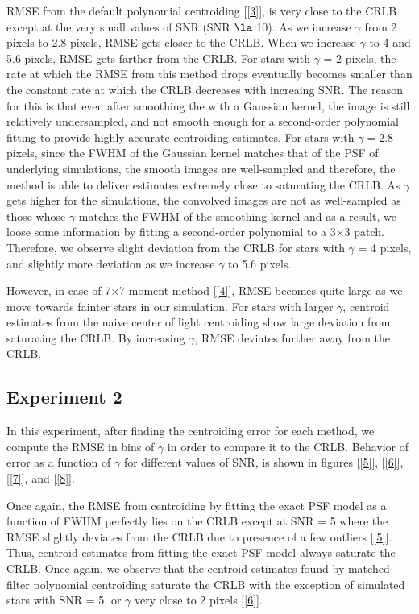 \documentclass[12pt, preprint]{aastex}
\begin{document}
RMSE from the default polynomial centroiding [\ref{3}],
is very close to the CRLB except at the very small values of SNR (SNR $\la$ 10).
As we increase $\gamma$ from 2 pixels to 2.8 pixels, RMSE gets closer
to the CRLB. When we increase $\gamma$ to
4 and 5.6 pixels, RMSE gets farther from the CRLB. For stars with $\gamma$ = 2 pixels, 
the rate at which the RMSE from this method drops
eventually becomes smaller than the constant rate at which the CRLB
decreases with increaing SNR. The reason for this is that even after smoothing
the with a Gaussian kernel, the image is still relatively undersampled, and not smooth enough
for a second-order polynomial fitting to provide highly accurate centroiding estimates.
For stars with $\gamma=2.8$ pixels, since the FWHM of the Gaussian kernel matches that 
of the PSF of underlying simulations, the smooth images are well-sampled and therefore, 
the method is able to deliver estimates extremely close to saturating the CRLB. As $\gamma$
gets higher for the simulations, the convolved images are not as well-sampled as those 
whose $\gamma$ matches the FWHM of the smoothing kernel and as a result, we loose
some information by fitting a second-order polynomial to a 3$\times$3 patch. Therefore,
 we observe slight deviation from the CRLB for stars with $\gamma$ = 4 pixels, and 
slightly more deviation as we increase $\gamma$ to 5.6 pixels.

However, in case of 7$\times$7 moment method [\ref{4}], RMSE becomes
quite large as we move towards fainter stars in our simulation.
For stars with larger $\gamma$, centroid estimates from the naive center of light 
centroiding show large deviation from saturating the CRLB. By increasing $\gamma$,
RMSE deviates further away from the CRLB.

\subsection{Experiment 2}

In this experiment, after finding the centroiding error for each method, we
compute the RMSE in bins of $\gamma$ in order to compare it to the CRLB. 
Behavior of error as a function of $\gamma$ for different values of SNR,
is shown in figures [\ref{5}], [\ref{6}], [\ref{7}], and [\ref{8}]. 
 
Once again, the RMSE from centroiding by fitting the exact PSF model as a function of FWHM
perfectly lies on the CRLB except at SNR = 5 where the RMSE slightly deviates
from the CRLB due to presence of a few outliers [\ref{5}]. 
Thus, centroid estimates from fitting
the exact PSF model always saturate the CRLB. Once again, we observe that the centroid
estimates found by matched-filter polynomial centroiding saturate the CRLB with the
exception of simulated stars with SNR = 5, or $\gamma$ very close to 2 pixels [\ref{6}].
\end{document}
